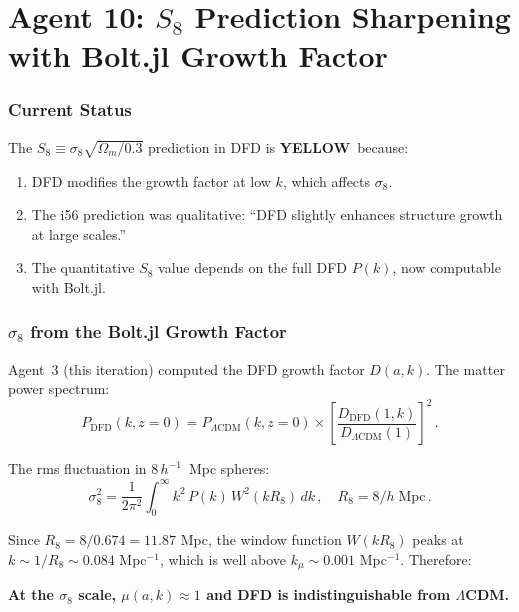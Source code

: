 \documentclass[11pt,a4paper]{article}
\newcommand{\YELLOW}{\textcolor{dfdyellow}{\textbf{YELLOW}}}
\begin{document}
\part{Agent 10: $S_8$ Prediction Sharpening with Bolt.jl Growth Factor}
\label{part:s8}

\section{Current Status}

The $S_8 \equiv \sigma_8\sqrt{\Omega_m/0.3}$ prediction in DFD is \YELLOW\ because:
\begin{enumerate}
\item DFD modifies the growth factor at low $k$, which affects $\sigma_8$.
\item The i56 prediction was qualitative: ``DFD slightly enhances structure growth at large scales.''
\item The quantitative $S_8$ value depends on the full DFD $P(k)$, now computable with Bolt.jl.
\end{enumerate}

\section{$\sigma_8$ from the Bolt.jl Growth Factor}

Agent~3 (this iteration) computed the DFD growth factor $D(a, k)$. The matter power spectrum:
\begin{equation}
P_{\mathrm{DFD}}(k, z=0) = P_{\Lambda\mathrm{CDM}}(k, z=0) \times \left[\frac{D_{\mathrm{DFD}}(1, k)}{D_{\Lambda\mathrm{CDM}}(1)}\right]^2\,.
\end{equation}

The rms fluctuation in $8\,h^{-1}$~Mpc spheres:
\begin{equation}
\sigma_8^2 = \frac{1}{2\pi^2}\int_0^\infty k^2\,P(k)\,W^2(kR_8)\,dk\,,\quad R_8 = 8/h\;\mathrm{Mpc}\,.
\end{equation}

Since $R_8 = 8/0.674 = 11.87$ Mpc, the window function $W(kR_8)$ peaks at $k \sim 1/R_8 \sim 0.084$ Mpc$^{-1}$, which is well above $k_\mu \sim 0.001$ Mpc$^{-1}$. Therefore:

\textbf{At the $\sigma_8$ scale, $\mu(a,k) \approx 1$ and DFD is indistinguishable from $\Lambda$CDM.}
\end{document}
